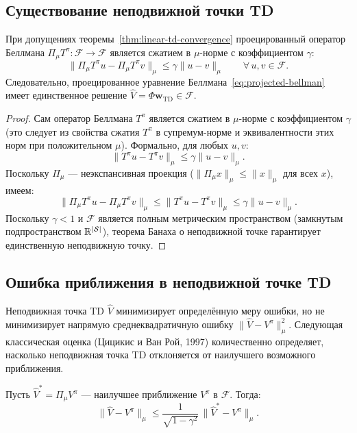 \subsection{Существование неподвижной точки TD}

\begin{theorem}
\label{thm:td-fixed-point}
При допущениях теоремы~\ref{thm:linear-td-convergence} проецированный оператор Беллмана $\Pi_\mu T^\pi : \mathcal{F} \to \mathcal{F}$ является сжатием в $\mu$-норме с коэффициентом $\gamma$:
\begin{equation}
\label{eq:projected-contraction}
\|\Pi_\mu T^\pi u - \Pi_\mu T^\pi v\|_\mu \leq \gamma \|u - v\|_\mu
\qquad \forall\, u, v \in \mathcal{F}.
\end{equation}
Следовательно, проецированное уравнение Беллмана~\eqref{eq:projected-bellman} имеет единственное решение $\hat{V} = \Phi \mathbf{w}_{\mathrm{TD}} \in \mathcal{F}$.
\end{theorem}

\begin{proof}
Сам оператор Беллмана $T^\pi$ является сжатием в $\mu$-норме с коэффициентом $\gamma$ (это следует из свойства сжатия $T^\pi$ в супремум-норме и эквивалентности этих норм при положительном $\mu$).  Формально, для любых $u, v$:
\[
\|T^\pi u - T^\pi v\|_\mu \leq \gamma \|u - v\|_\mu.
\]
Поскольку $\Pi_\mu$ --- неэкспансивная проекция ($\|\Pi_\mu x\|_\mu \leq \|x\|_\mu$ для всех $x$), имеем:
\[
\|\Pi_\mu T^\pi u - \Pi_\mu T^\pi v\|_\mu
\leq \|T^\pi u - T^\pi v\|_\mu
\leq \gamma \|u - v\|_\mu.
\]
Поскольку $\gamma < 1$ и $\mathcal{F}$ является полным метрическим пространством (замкнутым подпространством $\mathbb{R}^{|\mathcal{S}|}$), теорема Банаха о неподвижной точке гарантирует единственную неподвижную точку.
\end{proof}

\subsection{Ошибка приближения в неподвижной точке TD}

Неподвижная точка TD $\hat{V}$ минимизирует определённую меру ошибки, но не минимизирует напрямую среднеквадратичную ошибку $\|\hat{V} - V^\pi\|_\mu^2$.  Следующая классическая оценка (Цицикис и Ван Рой, 1997) количественно определяет, насколько неподвижная точка TD отклоняется от наилучшего возможного приближения.

\begin{theorem}
\label{thm:td-bound}
Пусть $\hat{V}^* = \Pi_\mu V^\pi$ --- наилучшее приближение $V^\pi$ в $\mathcal{F}$.  Тогда:
\begin{equation}
\label{eq:td-bound}
\|\hat{V} - V^\pi\|_\mu \leq \frac{1}{\sqrt{1 - \gamma^2}}\, \|\hat{V}^* - V^\pi\|_\mu.
\end{equation}
\end{theorem}

